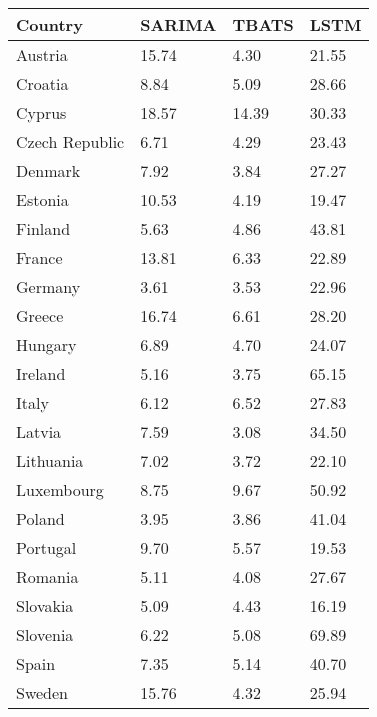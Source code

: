 \begin{tabular}{llll}
\toprule
Country & SARIMA & TBATS & LSTM \\
\midrule
Austria & 15.74 & 4.30 & 21.55 \\
Croatia & 8.84 & 5.09 & 28.66 \\
Cyprus & 18.57 & 14.39 & 30.33 \\
Czech Republic & 6.71 & 4.29 & 23.43 \\
Denmark & 7.92 & 3.84 & 27.27 \\
Estonia & 10.53 & 4.19 & 19.47 \\
Finland & 5.63 & 4.86 & 43.81 \\
France & 13.81 & 6.33 & 22.89 \\
Germany & 3.61 & 3.53 & 22.96 \\
Greece & 16.74 & 6.61 & 28.20 \\
Hungary & 6.89 & 4.70 & 24.07 \\
Ireland & 5.16 & 3.75 & 65.15 \\
Italy & 6.12 & 6.52 & 27.83 \\
Latvia & 7.59 & 3.08 & 34.50 \\
Lithuania & 7.02 & 3.72 & 22.10 \\
Luxembourg & 8.75 & 9.67 & 50.92 \\
Poland & 3.95 & 3.86 & 41.04 \\
Portugal & 9.70 & 5.57 & 19.53 \\
Romania & 5.11 & 4.08 & 27.67 \\
Slovakia & 5.09 & 4.43 & 16.19 \\
Slovenia & 6.22 & 5.08 & 69.89 \\
Spain & 7.35 & 5.14 & 40.70 \\
Sweden & 15.76 & 4.32 & 25.94 \\
\bottomrule
\end{tabular}
